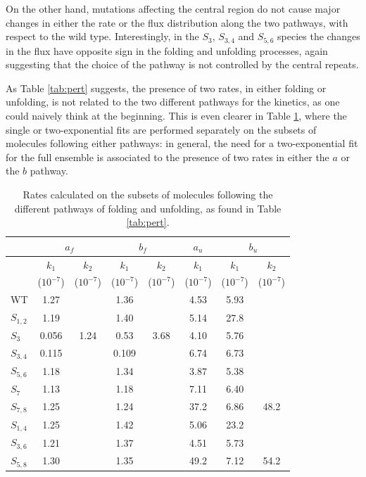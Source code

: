 On the other hand, mutations affecting the central region do not cause major
changes in either the rate or the flux distribution along the two pathways, with
respect to the wild type.
Interestingly, in the $S_3$, $S_{3,4}$ and $S_{5,6}$ species the changes in the
flux have opposite sign in the folding and unfolding processes, again suggesting
that the choice of the pathway is not controlled by the central repeats.

As Table \ref{tab:pert} suggests, the presence of two rates, in either folding
or unfolding, is not related to the two different pathways for the kinetics, as
one could naively think at the beginning. This is even clearer in Table
\ref{tab:pathwayrates}, where the single or two-exponential fits are performed
separately on the subsets of molecules following either pathways: in general,
the need for a  two-exponential fit for the full ensemble is associated to the
presence of two rates in either the $a$  or  the $b$ pathway.

\begin{table}[!htb]
\begin{tabular}{l|cc|cc|c|cc}
\hline\hline
&\multicolumn{2}{c|}{$a_f$} & \multicolumn{2}{c|}{$b_f$} &$a_u$ & \multicolumn{2}{c}{$b_u$}\\
\hline
& $k_1$ & $k_2$ & $k_1$ & $k_2$ & $k_1$ & $k_1$ & $k_2$\\
& ($10^{-7}$) & ($10^{-7}$) & ($10^{-7}$) & ($10^{-7}$) & ($10^{-7}$)& ($10^{-7}$)& ($10^{-7}$)\\
\hline
WT       &  1.27 &      & 1.36 &      & 4.53 & 5.93 &     \\
$S_{1,2}$&  1.19 &      & 1.40 &      & 5.14 & 27.8 &     \\
$S_{3}$  &  0.056& 1.24 & 0.53 & 3.68 & 4.10 & 5.76 &     \\
$S_{3,4}$& 0.115&      & 0.109 &     & 6.74 & 6.73 &     \\
$S_{5,6}$& 1.18 &      & 1.34 &      & 3.87 & 5.38 &     \\
$S_{7}$   & 1.13 &      & 1.18 &      & 7.11 & 6.40 &     \\
$S_{7,8}$&  1.25 &      & 1.24 &      & 37.2 & 6.86 & 48.2\\
$S_{1,4}$&  1.25 &      & 1.42 &      & 5.06 & 23.2 &     \\
$S_{3,6}$& 1.21 &      & 1.37 &      & 4.51 & 5.73 &     \\
$S_{5,8}$ & 1.30 &      & 1.35 &      & 49.2 & 7.12 & 54.2\\
\hline\hline
\end{tabular}
\caption{Rates calculated on the subsets of molecules following the different
pathways of folding and unfolding, as found in Table {\protect \ref{tab:pert}}.}
\label{tab:pathwayrates}
\end{table}

